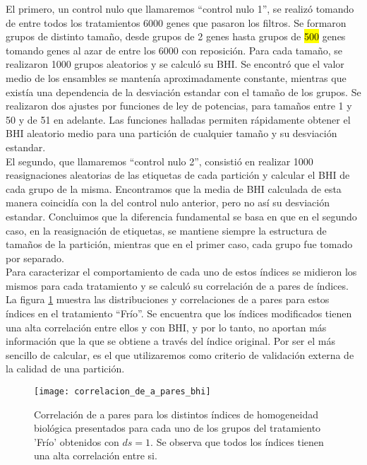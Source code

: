 El primero, un control nulo que llamaremos ``control nulo 1'', se realizó tomando de entre todos los tratamientos 6000 genes que pasaron los filtros. Se formaron grupos de distinto tamaño, desde grupos de 2 genes hasta grupos de \hl{500} genes tomando genes al azar de entre los 6000 con reposición. Para cada tamaño, se realizaron 1000 grupos aleatorios y se calculó su BHI. Se encontró que el valor medio de los ensambles se mantenía aproximadamente constante, mientras que existía una dependencia de la desviación estandar con el tamaño de los grupos. Se realizaron dos ajustes por funciones de ley de potencias, para tamaños entre 1 y 50 y de 51 en adelante. Las funciones halladas permiten rápidamente obtener el BHI aleatorio medio para una partición de cualquier tamaño y su desviación estandar.\\
El segundo, que llamaremos ``control nulo 2'', consistió en realizar 1000 reasignaciones aleatorias de las etiquetas de cada partición y calcular el BHI de cada grupo de la misma. Encontramos que la media de BHI calculada de esta manera coincidía con la del control nulo anterior, pero no así su desviación estandar. Concluimos que la diferencia fundamental se basa en que en el segundo caso, en la reasignación de etiquetas, se mantiene siempre la estructura de tamaños de la partición, mientras que en el primer caso, cada grupo fue tomado por separado.\\
Para caracterizar el comportamiento de cada uno de estos índices se midieron los mismos para cada tratamiento y se calculó su correlación de a pares de índices. La figura \ref{fig:correlacion_de_a_pares_bhi} muestra las distribuciones y correlaciones de a pares para estos índices en el tratamiento ``Frío''. Se encuentra que los índices modificados tienen una alta correlación entre ellos y con BHI, y por lo tanto, no aportan más información que la que se obtiene a través del índice original. Por ser el más sencillo de calcular, es el que utilizaremos como criterio de validación externa de la calidad de una partición.
\begin{figure}[h]
    \centering
    \texttt{[image: correlacion\_de\_a\_pares\_bhi]}
    \caption{Correlación de a pares para los distintos índices de homogeneidad biológica presentados para cada uno de los grupos del tratamiento 'Frío' obtenidos con $ds=1$. Se observa que todos los índices tienen una alta correlación entre si.}
    \label{fig:correlacion_de_a_pares_bhi}
\end{figure}

